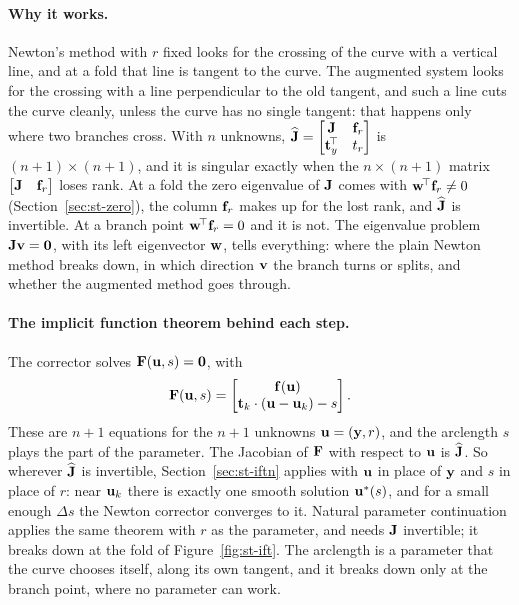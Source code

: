 \paragraph{Why it works.}
Newton's method with $r$ fixed looks for the crossing of the curve with a vertical
line, and at a fold that line is tangent to the curve. The augmented system looks
for the crossing with a line perpendicular to the old tangent, and such a line cuts
the curve cleanly, unless the curve has no single tangent: that happens only where
two branches cross. With $n$ unknowns,
$\widehat{\mathbf{J}} = \begin{bmatrix} \mathbf{J} & \mathbf{f}_r \\ \mathbf{t}_y^{\!\top} & t_r\end{bmatrix}$
is $(n+1)\times(n+1)$, and it is singular exactly when the $n\times(n+1)$ matrix
$\begin{bmatrix}\mathbf{J} & \mathbf{f}_r\end{bmatrix}$ loses rank. At a fold the zero
eigenvalue of $\mathbf{J}$ comes with $\mathbf{w}^{\!\top}\mathbf{f}_r \neq 0$
(Section~\ref{sec:st-zero}), the column $\mathbf{f}_r$ makes up for the lost rank, and
$\widehat{\mathbf{J}}$ is invertible. At a branch point $\mathbf{w}^{\!\top}\mathbf{f}_r = 0$ and it is
not. The eigenvalue problem $\mathbf{J}\mathbf{v} = \mathbf{0}$, with its left eigenvector
$\mathbf{w}$, tells everything: where the plain Newton method breaks down, in which
direction $\mathbf{v}$ the branch turns or splits, and whether the augmented method
goes through.

\paragraph{The implicit function theorem behind each step.}
%
The corrector solves $\mathbf{F}(\mathbf{u},s) = \mathbf{0}$, with
\[
  \mathbf{F}(\mathbf{u},s) = \begin{bmatrix} \mathbf{f}(\mathbf{u}) \\
  \mathbf{t}_k\cdot(\mathbf{u} - \mathbf{u}_k) - s \end{bmatrix}.
\]
These are $n+1$ equations for the $n+1$ unknowns $\mathbf{u} = (\mathbf{y},r)$, and the
arclength $s$ plays the part of the parameter. The Jacobian of $\mathbf{F}$ with respect to
$\mathbf{u}$ is $\widehat{\mathbf{J}}$. So wherever $\widehat{\mathbf{J}}$ is invertible,
Section~\ref{sec:st-iftn} applies with $\mathbf{u}$ in place of $\mathbf{y}$ and $s$ in place
of $r$: near $\mathbf{u}_k$ there is exactly one smooth solution $\mathbf{u}^*(s)$, and for a
small enough $\Delta s$ the Newton corrector converges to it. Natural parameter
continuation applies the same theorem with $r$ as the parameter, and needs
$\mathbf{J}$ invertible; it breaks down at the fold of Figure~\ref{fig:st-ift}. The
arclength is a parameter that the curve chooses itself, along its own tangent, and
it breaks down only at the branch point, where no parameter can work.

